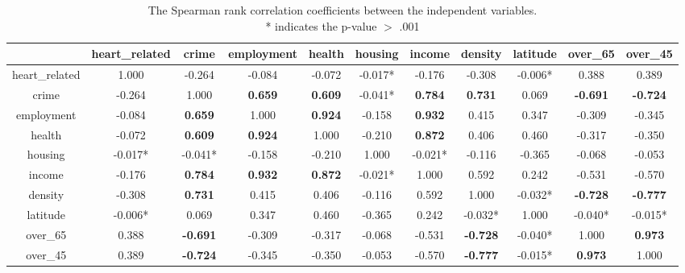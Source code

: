 \documentclass[a4paper]{article}
\begin{document}
\printbibliography



\begin{table*}[!htpb]
\scriptsize
	\begin{tabular}{|c|c|c|c|c|c|c|c|c|c|c|}
		\hline
		&
		heart\_related & crime & employment & health & housing & income & density & latitude & over\_65 & over\_45\\
		\hline
		heart\_related& 1.000& -0.264& -0.084& -0.072& -0.017*& -0.176& -0.308& -0.006*& 0.388& 0.389\\ 
		\hline
		crime& -0.264& 1.000& \textbf{0.659}& \textbf{0.609}& -0.041*& \textbf{0.784}& \textbf{0.731}& 0.069& \textbf{-0.691}& \textbf{-0.724}\\ 
		\hline
		employment& -0.084& \textbf{0.659}& 1.000& \textbf{0.924}& -0.158& \textbf{0.932}& 0.415& 0.347& -0.309& -0.345\\ 
		\hline
		health& -0.072& \textbf{0.609}& \textbf{0.924}& 1.000& -0.210& \textbf{0.872}& 0.406& 0.460& -0.317& -0.350\\ 
		\hline
		housing& -0.017*& -0.041*& -0.158& -0.210& 1.000& -0.021*& -0.116& -0.365& -0.068& -0.053\\ 
		\hline
		income& -0.176& \textbf{0.784}& \textbf{0.932}& \textbf{0.872}& -0.021*& 1.000& 0.592& 0.242& -0.531& -0.570\\ 
		\hline
		density& -0.308& \textbf{0.731}& 0.415& 0.406& -0.116& 0.592& 1.000& -0.032*& \textbf{-0.728}& \textbf{-0.777}\\ 
		\hline
		latitude& -0.006*& 0.069& 0.347& 0.460& -0.365& 0.242& -0.032*& 1.000& -0.040*& -0.015*\\ 
		\hline
		over\_65& 0.388& \textbf{-0.691}& -0.309& -0.317& -0.068& -0.531& \textbf{-0.728}& -0.040*& 1.000& \textbf{0.973}\\ 
		\hline
		over\_45& 0.389& \textbf{-0.724}& -0.345& -0.350& -0.053& -0.570& \textbf{-0.777}& -0.015*& \textbf{0.973}& 1.000\\ 
		\hline
	\end{tabular}
\caption{The Spearman rank correlation coefficients between the independent variables. \\
	* indicates the p-value $>$ .001}
\label{corr_table}
\end{table*}
\end{document}
